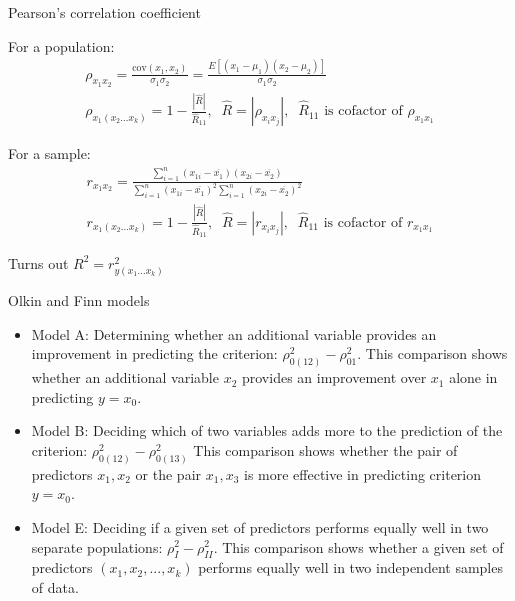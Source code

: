 \documentclass[10pt,pdf]{beamer}
\newcommand{\cov}{\mathrm{cov}}
\begin{document}

\begin{frame}[t]{Pearson's correlation coefficient}

For a population:
\begin{gather*}
  \rho_{x_1 x_2} = \frac{\cov(x_1, x_2)}{\sigma_1 \sigma_2} = \frac{E[(x_1 - \mu_1)(x_2 - \mu_2)]}{\sigma_1 \sigma_2} \\
  \rho_{x_1 (x_2 ... x_k)} = 1 - \frac{|\hat{R}|}{\hat{R}_{11}}, \;\; \hat{R} = |\rho_{x_i x_j}|, \;\; \hat{R}_{11} \text{ is cofactor of } \rho_{x_1 x_1}
\end{gather*}

For a sample:
\begin{gather*}
  r_{x_1 x_2} = \frac{\sum\limits_{i=1}^n (x_{1i} - \overline{x_1}) (x_{2i} - \overline{x_2})}{\sum\limits_{i=1}^n (x_{1i} - \overline{x_1})^2 \sum\limits_{i=1}^n (x_{2i} - \overline{x_2})^2} \\
  r_{x_1 (x_2 ... x_k)} = 1 - \frac{|\hat{R}|}{\hat{R}_{11}}, \;\; \hat{R} = |r_{x_i x_j}|, \;\; \hat{R}_{11} \text{ is cofactor of } r_{x_1 x_1}
\end{gather*}

\medskip

Turns out $R^2 = r_{y (x_1 ... x_k)}^2$

\end{frame}


\begin{frame}[t]{Olkin and Finn models}

\begin{itemize}
  \setlength{\itemsep}{15pt}
  \item Model A: Determining whether an additional variable provides an improvement in predicting the criterion: $\rho_{0 (1 2)}^2 - \rho_{0 1}^2$. This comparison shows whether an additional variable $x_2$ provides an improvement over $x_1$ alone in predicting $y = x_0$.
  \item Model B: Deciding which of two variables adds more to the prediction of the criterion:  $\rho_{0 (1 2)}^2 - \rho_{0 (1 3)}^2$ This comparison shows whether the pair of predictors $x_1, x_2$ or the pair $x_1, x_3$ is more effective in predicting criterion $y = x_0$.
  \item Model E: Deciding if a given set of predictors performs equally well in two separate populations: $\rho_I^2 - \rho_{II}^2$. This comparison shows whether a given set of predictors $(x_1, x_2, ... , x_k)$ performs equally well in two independent samples of data.
\end{itemize}

\end{frame}
\end{document}
